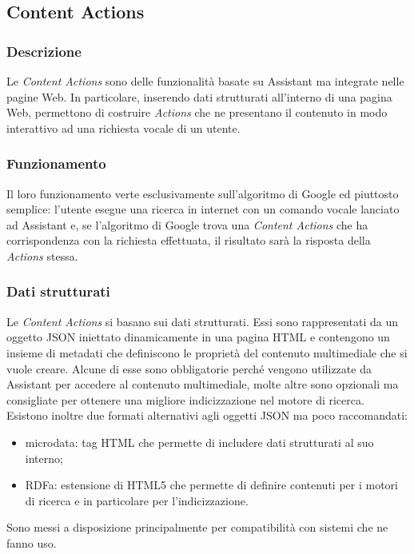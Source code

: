 	\subsection{Content Actions}
		\subsubsection{Descrizione}
		Le \emph{Content Actions} sono delle funzionalità basate su Assistant ma integrate nelle pagine Web. In particolare, inserendo dati strutturati all'interno di una pagina Web, permettono di costruire \emph{Actions} che ne presentano il contenuto in modo interattivo ad una richiesta vocale di un utente.
		\subsubsection{Funzionamento}
		Il loro funzionamento verte esclusivamente sull'algoritmo di Google ed piuttosto semplice: l'utente esegue una ricerca in internet con un comando vocale lanciato ad Assistant e, se l'algoritmo di Google trova una \emph{Content Actions} che ha corrispondenza con la richiesta effettuata, il risultato sarà la risposta della \emph{Actions} stessa.
		\subsubsection{Dati strutturati}
		Le \emph{Content Actions} si basano sui dati strutturati. Essi sono rappresentati da un oggetto JSON iniettato dinamicamente in una pagina HTML e contengono un insieme di metadati che definiscono le proprietà del contenuto multimediale che si vuole creare. Alcune di esse sono obbligatorie perché vengono utilizzate da Assistant per accedere al contenuto multimediale, molte altre sono opzionali ma consigliate per ottenere una migliore indicizzazione nel motore di ricerca. \\
		Esistono inoltre due formati alternativi agli oggetti JSON ma poco raccomandati:
		\begin{itemize}
			\item microdata: tag HTML che permette di includere dati strutturati al suo interno;
			\item RDFa: estensione di HTML5 che permette di definire contenuti per i motori di ricerca e in particolare per l'indicizzazione.
		\end{itemize}
		Sono messi a disposizione principalmente per compatibilità con sistemi che ne fanno uso.
